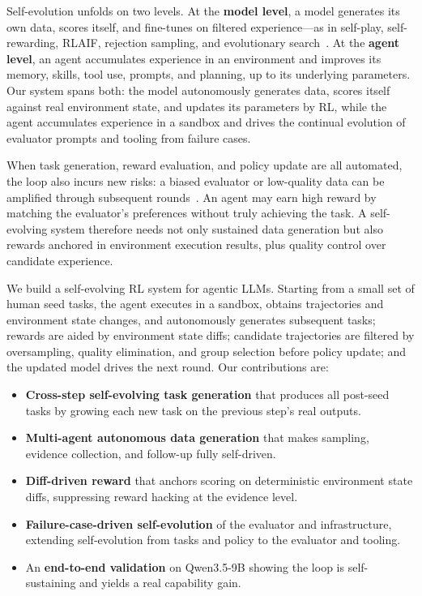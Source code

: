 \documentclass[twocolumn,a4paper]{ctexart}
\begin{document}
Self-evolution unfolds on two levels. At the \textbf{model level}, a model generates its own data, scores itself, and fine-tunes on filtered experience---as in self-play, self-rewarding, RLAIF, rejection sampling, and evolutionary search~\cite{self_play,self_rewarding,rlaif,absolute_zero}. At the \textbf{agent level}, an agent accumulates experience in an environment and improves its memory, skills, tool use, prompts, and planning, up to its underlying parameters. Our system spans both: the model autonomously generates data, scores itself against real environment state, and updates its parameters by RL, while the agent accumulates experience in a sandbox and drives the continual evolution of evaluator prompts and tooling from failure cases.

When task generation, reward evaluation, and policy update are all automated, the loop also incurs new risks: a biased evaluator or low-quality data can be amplified through subsequent rounds~\cite{reward_hacking_def,reward_overoptimization}. An agent may earn high reward by matching the evaluator's preferences without truly achieving the task. A self-evolving system therefore needs not only sustained data generation but also rewards anchored in environment execution results, plus quality control over candidate experience.

We build a self-evolving RL system for agentic LLMs. Starting from a small set of human seed tasks, the agent executes in a sandbox, obtains trajectories and environment state changes, and autonomously generates subsequent tasks; rewards are aided by environment state diffs; candidate trajectories are filtered by oversampling, quality elimination, and group selection before policy update; and the updated model drives the next round. Our contributions are:

\begin{itemize}
\item \textbf{Cross-step self-evolving task generation} that produces all post-seed tasks by growing each new task on the previous step's real outputs.
\item \textbf{Multi-agent autonomous data generation} that makes sampling, evidence collection, and follow-up fully self-driven.
\item \textbf{Diff-driven reward} that anchors scoring on deterministic environment state diffs, suppressing reward hacking at the evidence level.
\item \textbf{Failure-case-driven self-evolution} of the evaluator and infrastructure, extending self-evolution from tasks and policy to the evaluator and tooling.
\item An \textbf{end-to-end validation} on Qwen3.5-9B showing the loop is self-sustaining and yields a real capability gain.
\end{itemize}
\end{document}
